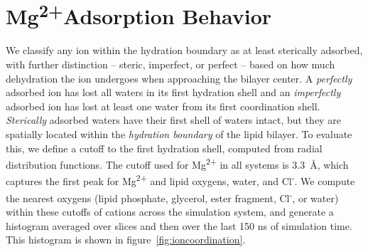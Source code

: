 \documentclass[journal=langd5,manuscript=article]{achemso}
\newcommand{\mg}{Mg\textsuperscript{2+}}
\newcommand{\cl}{Cl\textsuperscript{-}}
\begin{document}
\section{\mg Adsorption Behavior}
We classify any ion within the hydration boundary as at least sterically adsorbed, with further distinction -- steric, imperfect, or perfect -- based on how much dehydration the ion undergoes when approaching the bilayer center. A \emph{perfectly} adsorbed ion has lost all waters in its first hydration shell and an  \emph{imperfectly} adsorbed ion
has lost at least one water from its first coordination shell. 
{\emph{Sterically} adsorbed} waters have their first shell of waters intact, but 
they are spatially located within the \emph{hydration boundary} of the lipid bilayer. To evaluate this, we define a cutoff to the first hydration shell,
computed from radial distribution functions. The cutoff used for \mg{} in all systems is 3.3~\AA, which captures the first peak for \mg{} and lipid oxygens, water, and \cl{}. 
We compute the nearest oxygens (lipid phosphate, glycerol, ester fragment, \cl{}, or water) within these
cutoffs of cations across the simulation system, and generate a histogram averaged over slices and then over the last 150 ns of simulation time. This histogram is shown in 
figure~\ref{fig:ioncoordination}.
\end{document}
